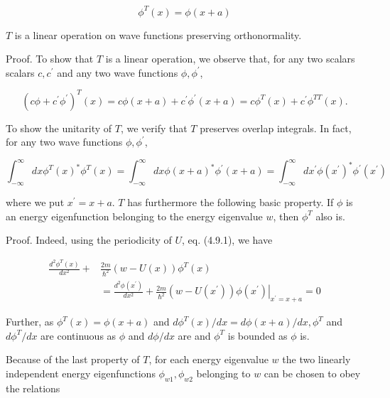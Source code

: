 \documentclass{article}
\begin{document}
\begin{equation*}
\phi^{T}(x)=\phi(x+a) \tag{4.9.4}
\end{equation*}
 
$T$ is a linear operation on wave functions preserving orthonormality.

Proof. To show that $T$ is a linear operation, we observe that, for any two scalars scalars $c, c^{\prime}$ and any two wave functions $\phi, \phi^{\prime}$,
 
\begin{equation*}
\left(c \phi+c^{\prime} \phi^{\prime}\right)^{T}(x)=c \phi(x+a)+c^{\prime} \phi^{\prime}(x+a)=c \phi^{T}(x)+c^{\prime} \phi^{T T}(x) . \tag{4.9.5}
\end{equation*}
 

To show the unitarity of $T$, we verify that $T$ preserves overlap integrals. In fact, for any two wave functions $\phi, \phi^{\prime}$,
 
\begin{equation*}
\int_{-\infty}^{\infty} d x \phi^{T}(x)^{*} \phi^{T}(x)=\int_{-\infty}^{\infty} d x \phi(x+a)^{*} \phi^{\prime}(x+a)=\int_{-\infty}^{\infty} d x^{\prime} \phi\left(x^{\prime}\right)^{*} \phi^{\prime}\left(x^{\prime}\right) \tag{4.9.6}
\end{equation*}
 
where we put $x^{\prime}=x+a$.
$T$ has furthermore the following basic property. If $\phi$ is an energy eigenfunction belonging to the energy eigenvalue $w$, then $\phi^{T}$ also is.

Proof. Indeed, using the periodicity of $U$, eq. (4.9.1), we have
 
\begin{align*}
\frac{d^{2} \phi^{T}(x)}{d x^{2}}+ & \frac{2 m}{\hbar^{2}}(w-U(x)) \phi^{T}(x)  \tag{4.9.7}\\
& =\frac{d^{2} \phi\left(x^{\prime}\right)}{d x^{2}}+\left.\frac{2 m}{\hbar^{2}}\left(w-U\left(x^{\prime}\right)\right) \phi\left(x^{\prime}\right)\right|_{x^{\prime}=x+a}=0
\end{align*}
 

Further, as $\phi^{T}(x)=\phi(x+a)$ and $d \phi^{T}(x) / d x=d \phi(x+a) / d x, \phi^{T}$ and $d \phi^{T} / d x$ are continuous as $\phi$ and $d \phi / d x$ are and $\phi^{T}$ is bounded as $\phi$ is.

Because of the last property of $T$, for each energy eigenvalue $w$ the two linearly independent energy eigenfunctions $\phi_{w 1}, \phi_{w 2}$ belonging to $w$ can be chosen to obey the relations
 
\end{document}
